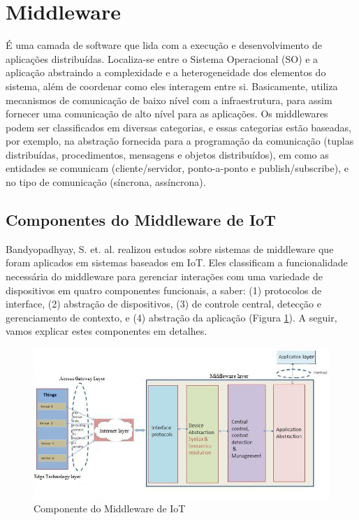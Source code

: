 \section{Middleware\label{subsec:Fund_Middleware}}

É uma camada de software que lida com a execução e desenvolvimento
de aplicações distribuídas. Localiza-se entre o Sistema Operacional
(SO) e a aplicação abstraindo a complexidade e a heterogeneidade dos
elementos do sistema, além de coordenar como eles interagem entre
si\cite{mahmoud2004middleware}. Basicamente, utiliza mecanismos de
comunicação de baixo nível com a infraestrutura, para assim fornecer
uma comunicação de alto nível para as aplicações. Os middlewares podem
ser classificados em diversas categorias, e essas categorias estão
baseadas, por exemplo, na abstração fornecida para a programação da
comunicação (tuplas distribuídas, procedimentos, mensagens e objetos
distribuídos), em como as entidades se comunicam (cliente/servidor,
ponto-a-ponto e publish/subscribe), e no tipo de comunicação (síncrona,
assíncrona). 

\subsection{Componentes do Middleware de IoT}

Bandyopadhyay, S. et. al. realizou estudos sobre sistemas de middleware
que foram aplicados em sistemas baseados em IoT\cite{Bandyopadhyay2011}.
Eles classificam a funcionalidade necessária do middleware para gerenciar
interações com uma variedade de dispositivos em quatro componentes
funcionais, a saber: (1) protocolos de interface, (2) abstração de
dispositivos, (3) de controle central, detecção e gerenciamento de
contexto, e (4) abstração da aplicação (Figura \ref{fig:middleware_bandyopadhyay}).
A seguir, vamos explicar estes componentes em detalhes.

\begin{figure}[H]
\begin{centering}
\includegraphics[width=1\linewidth]{Imagens/Cap_2/middleware_bandyopadhyay}
\par\end{centering}
\caption{Componente do Middleware de IoT \cite{Bandyopadhyay2011}\label{fig:middleware_bandyopadhyay}}
\end{figure}


